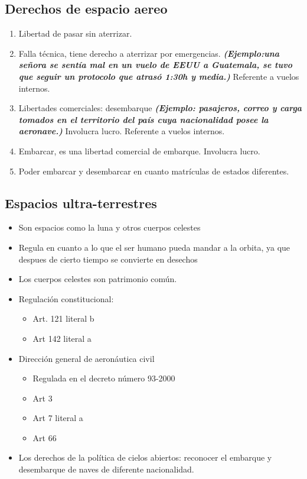 \subsection{Derechos de espacio aereo}
\begin{enumerate}
    \item Libertad de pasar sin aterrizar.
    \item Falla técnica, tiene derecho a aterrizar por emergencias. \textbf{\emph{(Ejemplo:una señora se sentía mal en un vuelo de EEUU a Guatemala, se tuvo que seguir un protocolo que atrasó 1:30h y media.)}} Referente a vuelos internos.
    \item Libertades comerciales: desembarque \textbf{\emph{(Ejemplo: pasajeros, correo y carga tomados en el territorio del país cuya nacionalidad posee la aeronave.)}} Involucra lucro. Referente a vuelos internos.
    \item Embarcar, es una libertad comercial de embarque. Involucra lucro.
    \item Poder embarcar y desembarcar en cuanto matrículas de estados diferentes.
\end{enumerate}

\subsection{Espacios ultra-terrestres}
\begin{itemize}
    \item Son espacios como la luna y otros cuerpos celestes
    \item Regula en cuanto a lo que el ser humano pueda mandar a la orbita, ya que despues de cierto tiempo se convierte en desechos
    \item Los cuerpos celestes son patrimonio común.
    \item Regulación constitucional:
    \begin{itemize}
        \item Art. 121 literal b
        \item Art 142 literal a 
    \end{itemize} 
    \item Dirección general de aeronáutica civil
    \begin{itemize}
        \item Regulada en el decreto número 93-2000
        \item Art 3
        \item Art 7 literal a
        \item Art 66
    \end{itemize}
    \item Los derechos de la política de cielos abiertos: reconocer el embarque y desembarque de naves de diferente nacionalidad.
\end{itemize}


